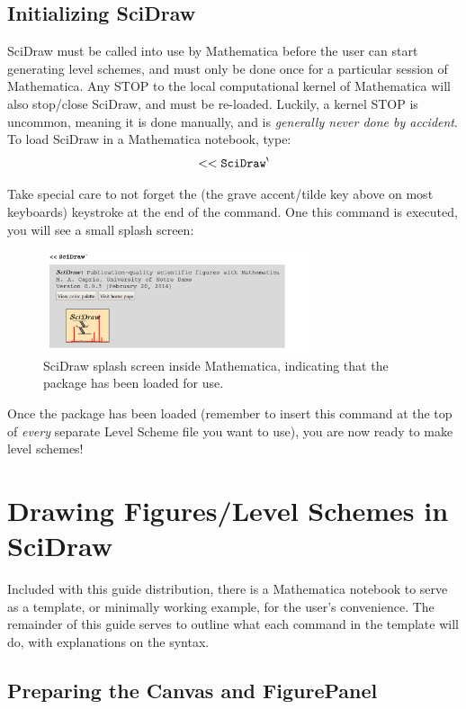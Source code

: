 \documentclass[portrait,10pt]{article}
\begin{document}
\subsection{Initializing SciDraw}

SciDraw must be called into use by Mathematica before the user can start generating level schemes, and must only be done once for a particular session of Mathematica. Any STOP to the local computational kernel of Mathematica will also stop/close SciDraw, and must be re-loaded. Luckily, a kernel STOP is uncommon, meaning it is done manually, and is \textit{generally never done by accident}. To load SciDraw in a Mathematica notebook, type:
\[
{\tt <<SciDraw^\backprime}
\]

Take special care to not forget the \keystroke{$^\sim\backprime$} (the grave accent/tilde key above \Tab on most keyboards) keystroke at the end of the command. One this command is executed, you will see a small splash screen:

\begin{figure}[h]
\begin{center}
\includegraphics[width=0.70\textwidth]{SciDraw_splash.png}
\caption{SciDraw splash screen inside Mathematica, indicating that the package has been loaded for use.\label{fig:splash}}
\end{center}
\end{figure}

Once the package has been loaded (remember to insert this command at the top of \textit{every} separate Level Scheme file you want to use), you are now ready to make level schemes!
\section{Drawing Figures/Level Schemes in SciDraw}

Included with this guide distribution, there is a Mathematica notebook to serve as a template, or minimally working example, for the user's convenience. The remainder of this guide serves to outline what each command in the template will do, with explanations on the syntax.
\subsection{Preparing the Canvas and FigurePanel}
\end{document}
